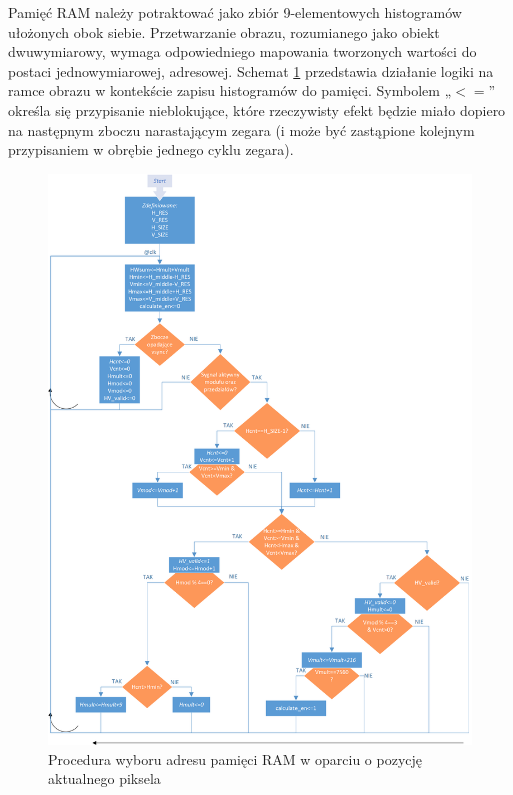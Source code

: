 Pamięć RAM należy potraktować jako zbiór 9-elementowych histogramów ułożonych obok siebie. 
Przetwarzanie obrazu, rozumianego jako obiekt dwuwymiarowy, wymaga odpowiedniego mapowania tworzonych wartości do postaci jednowymiarowej, adresowej. 
Schemat \ref{fig:hog_histogram_scheme} przedstawia działanie logiki na ramce obrazu w kontekście zapisu histogramów do pamięci. 
Symbolem „$<=$” określa się przypisanie nieblokujące, które rzeczywisty efekt będzie miało dopiero na następnym zboczu narastającym zegara (i może być zastąpione kolejnym przypisaniem w obrębie jednego cyklu zegara).
 
\begin{figure}[]
	\centering
	\includegraphics[width=16cm]{4_HOG_Histograms.png}
	\caption{Procedura wyboru adresu pamięci RAM w oparciu o pozycję aktualnego piksela}
	\label{fig:hog_histogram_scheme}
\end{figure} 
 
